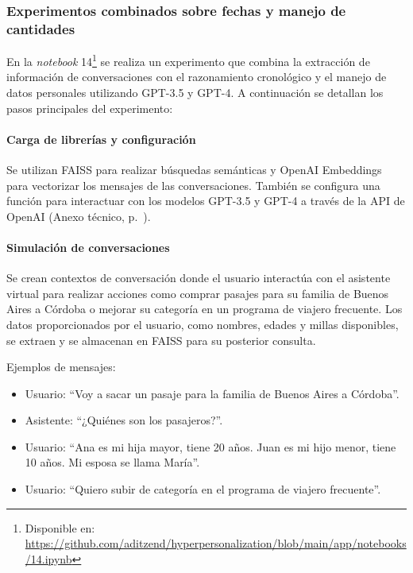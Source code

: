 \subsubsection{Experimentos combinados sobre fechas y manejo de cantidades}

En la \textit{notebook} 14\footnote{Disponible en: \url{https://github.com/aditzend/hyperpersonalization/blob/main/app/notebooks/14.ipynb}} se realiza un experimento que combina la extracción de información de conversaciones con el razonamiento cronológico y el manejo de datos personales utilizando GPT-3.5 y GPT-4. A continuación se detallan los pasos principales del experimento:

\paragraph{Carga de librerías y configuración}

Se utilizan FAISS para realizar búsquedas semánticas y OpenAI Embeddings para vectorizar los mensajes de las conversaciones. También se configura una función para interactuar con los modelos GPT-3.5 y GPT-4 a través de la API de OpenAI (Anexo técnico, p.~\pageref{anexo:code-4-1-14-1}).

\paragraph{Simulación de conversaciones}

Se crean contextos de conversación donde el usuario interactúa con el asistente virtual para realizar acciones como comprar pasajes para su familia de Buenos Aires a Córdoba o mejorar su categoría en un programa de viajero frecuente. Los datos proporcionados por el usuario, como nombres, edades y millas disponibles, se extraen y se almacenan en FAISS para su posterior consulta.

Ejemplos de mensajes:
\begin{itemize}
\item Usuario: ``Voy a sacar un pasaje para la familia de Buenos Aires a Córdoba''.
\item Asistente: ``¿Quiénes son los pasajeros?''.
\item Usuario: ``Ana es mi hija mayor, tiene 20 años. Juan es mi hijo menor, tiene 10 años. Mi esposa se llama María''.
\item Usuario: ``Quiero subir de categoría en el programa de viajero frecuente''.
\end{itemize}

